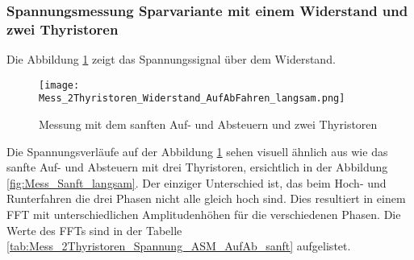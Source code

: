 \newpage
\subsubsection{Spannungsmessung Sparvariante mit einem Widerstand und zwei Thyristoren}

Die Abbildung \ref{fig:Mess_2Thyristoren_Widerstand_AufAbFahren_langsam} zeigt das Spannungssignal über dem Widerstand. 

\begin{figure}[ht!]
	\centering
	\texttt{[image: Mess\_2Thyristoren\_Widerstand\_AufAbFahren\_langsam.png]}	
	\caption{Messung mit dem sanften Auf- und Absteuern und zwei Thyristoren}\label{fig:Mess_2Thyristoren_Widerstand_AufAbFahren_langsam}	
\end{figure}

Die Spannungsverläufe auf der Abbildung \ref{fig:Mess_2Thyristoren_Widerstand_AufAbFahren_langsam} sehen visuell ähnlich aus wie das sanfte Auf- und Absteuern mit drei Thyristoren, ersichtlich in der Abbildung \ref{fig:Mess_Sanft_langsam}.  Der einziger Unterschied ist, das beim Hoch- und Runterfahren die drei Phasen nicht alle gleich hoch sind. Dies resultiert in einem FFT mit unterschiedlichen Amplitudenhöhen für die verschiedenen Phasen. Die Werte des FFTs sind in der Tabelle \ref{tab:Mess_2Thyristoren_Spannung_ASM_AufAb_sanft} aufgelistet. \\\\

